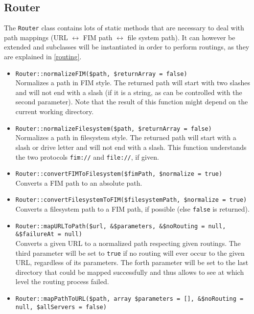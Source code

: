 \documentclass{scrartcl}
\begin{document}
   \subsection{Router}
      The \lstinline!Router! class contains lots of static methods that are necessary to deal with path mappings (URL $\leftrightarrow$ FIM path $\leftrightarrow$ file system path). It can however be extended and subclasses will be instantiated in order to perform routings, as they are explained in \autoref{routing}.
      \begin{itemize}
         \item \lstinline!Router::normalizeFIM($path, $returnArray = false)! \\
             Normalizes a path in FIM style. The returned path will start with two slashes and will not end with a slash (if it is a string, as can be controlled with the second parameter). Note that the result of this function might depend on the current working directory.
          \item \lstinline!Router::normalizeFilesystem($path, $returnArray = false)! \\
             Normalizes a path in filesystem style. The returned path will start with a slash or drive letter and will not end with a slash. This function understands the two protocols \texttt{fim://} and \texttt{file://}, if given.
          \item \lstinline!Router::convertFIMToFilesystem($fimPath, $normalize = true)! \\
             Converts a FIM path to an absolute path.
          \item \lstinline!Router::convertFilesystemToFIM($filesystemPath, $normalize = true)! \\
             Converts a filesystem path to a FIM path, if possible (else \lstinline!false! is returned).
          \item \lstinline!Router::mapURLToPath($url, &$parameters, &$noRouting = null, &$failureAt = null)! \\
             Converts a given URL to a normalized path respecting given routings. The third parameter will be set to \lstinline!true! if no routing will ever occur to the given URL, regardless of its parameters. The forth parameter will be set to the last directory that could be mapped successfully and thus allows to see at which level the routing process failed.
          \item \lstinline!Router::mapPathToURL($path, array $parameters = [], &$noRouting = null, $allServers = false)! \\

\end{itemize}
\end{document}
